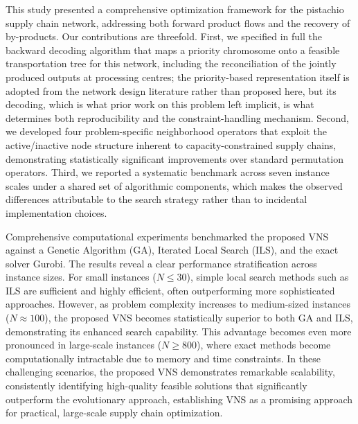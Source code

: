 \documentclass[preprint,12pt,authoryear]{elsarticle}
\begin{document}
This study presented a comprehensive optimization framework for the pistachio supply chain network, addressing both forward product flows and the recovery of by-products. 
Our contributions are threefold. First, we specified in full the backward decoding algorithm that maps a priority chromosome onto a feasible transportation tree for this network,
including the reconciliation of the jointly produced outputs at processing centres; the priority-based representation itself is adopted from the network design literature rather than
proposed here, but its decoding, which is what prior work on this problem left implicit, is what determines both reproducibility and the constraint-handling mechanism. Second, we
developed four problem-specific neighborhood operators that exploit the active/inactive node structure inherent to capacity-constrained supply chains, demonstrating statistically
significant improvements over standard permutation operators. Third, we reported a systematic benchmark across seven instance scales under a shared set of algorithmic components,
which makes the observed differences attributable to the search strategy rather than to incidental implementation choices.

Comprehensive computational experiments benchmarked the proposed VNS against a Genetic Algorithm (GA), Iterated Local Search (ILS), and the exact solver Gurobi. 
The results reveal a clear performance stratification across instance sizes. For small instances ($N \le 30$), simple local search methods such as ILS are sufficient and highly efficient, 
often outperforming more sophisticated approaches. However, as problem complexity increases to medium-sized instances ($N \approx 100$), the proposed VNS becomes statistically superior 
to both GA and ILS, demonstrating its enhanced search capability. This advantage becomes even more pronounced in large-scale instances ($N \ge 800$), where exact methods become computationally 
intractable due to memory and time constraints. In these challenging scenarios, the proposed VNS demonstrates remarkable scalability, consistently identifying high-quality 
feasible solutions that significantly outperform the evolutionary approach, establishing VNS as a promising approach for practical, large-scale supply chain optimization.
\end{document}
